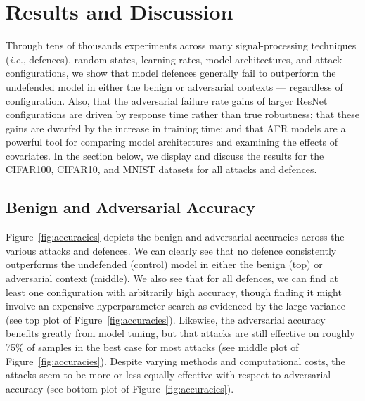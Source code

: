 \section{Results and Discussion}


Through tens of thousands experiments across many signal-processing techniques (\textit{i.e.}, defences), random states, learning rates, model architectures, and attack configurations, we show that model defences generally fail to outperform the undefended model in either the benign or adversarial contexts --- regardless of configuration. Also, that the adversarial failure rate gains of larger ResNet configurations are driven by response time rather than true robustness; that these gains are dwarfed by the increase in training time; and that AFR models are a powerful tool for comparing model architectures and examining the effects of covariates. In the section below, we display and discuss the results for the CIFAR100, CIFAR10, and MNIST datasets for all attacks and defences.

\subsection{Benign and Adversarial Accuracy}
Figure~\ref{fig:accuracies} depicts the benign and adversarial accuracies across the various attacks and defences. We can clearly see that no defence consistently outperforms the undefended (control) model in either the benign (top) or adversarial context (middle). We also see that for all defences, we can find at least one configuration with arbitrarily high accuracy, though finding it might involve an expensive hyperparameter search as evidenced by the large variance (see top plot of Figure~\ref{fig:accuracies}). Likewise, the adversarial accuracy benefits greatly from model tuning, but that attacks are still effective on roughly 75\% of samples in the best case for most attacks (see middle plot of Figure~\ref{fig:accuracies}). Despite varying methods and computational costs, the attacks seem to be more or less equally effective with respect to adversarial accuracy (see bottom plot of Figure~\ref{fig:accuracies}).

